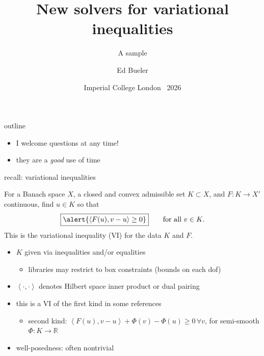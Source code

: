 \documentclass[aspectratio=169,10pt]{beamer}
\title{New solvers for variational inequalities}
\subtitle{A sample}
\author{Ed Bueler}
\institute{University of Alaska Fairbanks}
\date{Imperial College London \, 2026}
\newcommand{\RR}{{\mathbb{R}}}
\newcommand{\ip}[2]{\left\langle #1, #2 \right\rangle}
\newcommand{\lc}{{\text{\large $\circ$}}}
\begin{document}
\begin{frame}
  \titlepage
\end{frame}


\begin{frame}{outline}
  \tableofcontents
\end{frame}


\begin{frame}[standout]
\begin{itemize}
\item I welcome questions at any time!
\item they are a \emph{good} use of time
\end{itemize}
\end{frame}


\begin{frame}{recall: variational inequalities}

\begin{definition}
For a Banach space $X$, a closed and convex \alert{admissible set $K\subset X$}, and \alert{$F: K\to X'$ continuous}, find $u\in K$ so that
  $$\boxed{\alert{\ip{F(u)}{v-u} \ge 0}} \qquad \text{for all } v\in K.$$
This is the \alert{variational inequality} (VI) for the data $K$ and $F$.
\end{definition}

\hfill 

\vspace{-16mm}
\begin{itemize}
\item $K$ given via inequalities and/or equalities
    \begin{itemize}
    \item[$\lc$] libraries may restrict to box constraints (bounds on each dof)
    \end{itemize}

\item $\ip{\cdot}{\cdot}$ denotes Hilbert space inner product \alert{or dual pairing}

\smallskip
\item this is a \alert{VI of the first kind} in some references
    \begin{itemize}
    \item[$\lc$] second kind: $\ip{F(u)}{v-u} + \Phi(v) - \Phi(u) \ge 0 \, \forall v$, for semi-smooth $\Phi:K\to \RR$
    \end{itemize}
\item well-posedness: often nontrivial
\end{itemize}
\end{frame}
\end{document}
